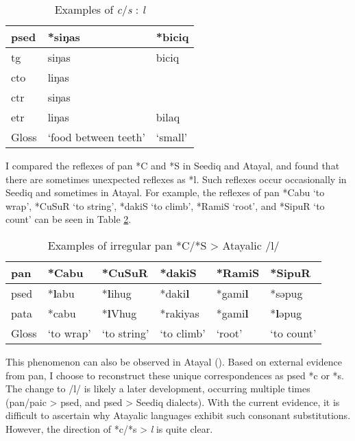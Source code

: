 \begin{table}[!htbp]
\centering
\caption{Examples of \textit{c}/\textit{s} : \textit{l}}
\label{tab:irr_cls}
\begin{tabular}{lll}
\hline
\acs{psed} & *siŋas               & *biciq  \\ \hline
\acs{tg}   & siŋas                & biciq   \\ 
\acs{cto}  & liŋas                &         \\
\acs{ctr}  & siŋas                &         \\
\acs{etr}  & liŋas                & bilaq   \\ \hline
Gloss      & `food between teeth' & `small' \\ \hline
\end{tabular}
\end{table}

I compared the reflexes of \acl{pan} *C and *S in Seediq and Atayal, and found that there are sometimes unexpected reflexes as *l. Such reflexes occur occasionally in Seediq and sometimes in Atayal. For example, the reflexes of \acl{pan} *Cabu `to wrap', *CuSuR `to string', *dakiS `to climb', *RamiS `root', and *SipuR `to count' can be seen in Table \ref{tab:panclsaic}.

\begin{table}[!htbp]
\centering
\caption{Examples of irregular \acs{pan} *C/*S > Atayalic /l/}
\label{tab:panclsaic}
\begin{tabular}{llllll}
\hline
\acs{pan}  & *Cabu     & *CuSuR      & *dakiS     & *RamiS & *SipuR    \\ \hline
\acs{psed} & *\textbf{l}abu     & *\textbf{l}ihug      & *daki\textbf{l}     & *gami\textbf{l} & *səpug    \\
\acs{pata} & *cabu     & *\textbf{l}Vhug      & *rakiyas   & *gami\textbf{l} & *\textbf{l}əpug    \\ \hline
Gloss      & `to wrap' & `to string' & `to climb' & `root' & `to count' \\ \hline
\end{tabular}
\end{table}

This phenomenon can also be observed in Atayal (\cite[173]{goderich2020phd}). Based on external evidence from \acl{pan}, I choose to reconstruct these unique correspondences as \acl{psed} *c or *s. The change to /l/ is likely a later development, occurring multiple times (\acs{pan}/\acs{paic} > \acs{psed}, and \acs{psed} > Seediq dialects). With the current evidence, it is difficult to ascertain why Atayalic languages exhibit such consonant substitutions. However, the direction of *c/*s > \textit{l} is quite clear.

